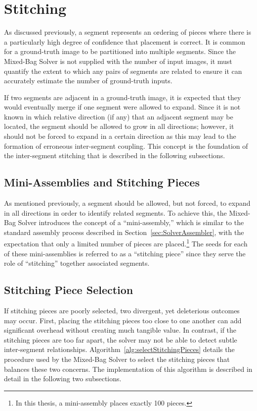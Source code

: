 \section{Stitching}\label{sec:stitching}

As discussed previously, a segment represents an ordering of pieces where there is a particularly high degree of confidence that placement is correct.  It is common for a ground-truth image to be partitioned into multiple segments. Since the Mixed-Bag Solver is not supplied with the number of input images, it must quantify the extent to which any pairs of segments are related to ensure it can accurately estimate the number of ground-truth inputs.  

If two segments are adjacent in a ground-truth image, it is expected that they would eventually merge if one segment were allowed to expand. Since it is not known in which relative direction (if any) that an adjacent segment may be located, the segment should be allowed to grow in all directions; however, it should not be forced to expand in a certain direction as this may lead to the formation of erroneous inter-segment coupling.  This concept is the foundation of the inter-segment stitching that is described in the following subsections.

\subsection{Mini-Assemblies and Stitching Pieces}

As mentioned previously, a segment should be allowed, but not forced, to expand in all directions in order to identify related segments.  To achieve this, the Mixed-Bag Solver introduces the concept of a ``mini-assembly,'' which is similar to the standard assembly process described in Section~\ref{sec:SolverAssembler}, with the expectation that only a limited number of pieces are placed.\footnote{In this thesis, a mini-assembly places exactly 100 pieces.}  The seeds for each of these mini-assemblies is referred to as a ``stitching piece'' since they serve the role of ``stitching'' together associated segments.

\subsection{Stitching Piece Selection}\label{sec:stitchingPieceSelection}

If stitching pieces are poorly selected, two divergent, yet deleterious outcomes may occur.  First, placing the stitching pieces too close to one another can add significant overhead without creating much tangible value.  In contrast, if the stitching pieces are too far apart, the solver may not be able to detect subtle inter-segment relationships.  Algorithm~\ref{alg:selectStitchingPieces} details the procedure used by the Mixed-Bag Solver to select the stitching pieces that balances these two concerns.  The implementation of this algorithm is described in detail in the following two subsections.

